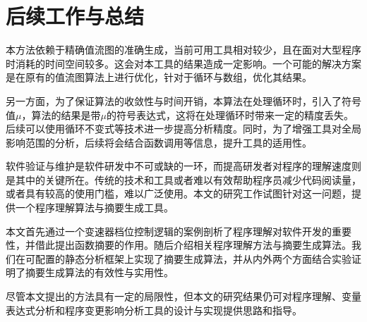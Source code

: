 \section{后续工作与总结}

本方法依赖于精确值流图的准确生成，当前可用工具相对较少，且在面对大型程序时消耗的时间空间较多。这会对本工具的结果造成一定影响。一个可能的解决方案是在原有的值流图算法上进行优化，针对于循环与数组，优化其结果。

另一方面，为了保证算法的收敛性与时间开销，本算法在处理循环时，引入了符号值$ \mu $，算法的结果是带$ \mu $的符号表达式，这将在处理循环时带来一定的精度丢失。后续可以使用循环不变式等技术进一步提高分析精度。同时，为了增强工具对全局影响范围的分析，后续将会结合函数调用等信息，提升工具的适用性。

软件验证与维护是软件研发中不可或缺的一环，而提高研发者对程序的理解速度则是其中的关键所在。传统的技术和工具或者难以有效帮助程序员减少代码阅读量，或者具有较高的使用门槛，难以广泛使用。本文的研究工作试图针对这一问题，提供一个程序理解算法与摘要生成工具。

本文首先通过一个变速器档位控制逻辑的案例剖析了程序理解对软件开发的重要性，并借此提出函数摘要的作用。随后介绍相关程序理解方法与摘要生成算法。我们在可配置的静态分析框架上实现了摘要生成算法，并从内外两个方面结合实验证明了摘要生成算法的有效性与实用性。

尽管本文提出的方法具有一定的局限性，但本文的研究结果仍可对程序理解、变量表达式分析和程序变更影响分析工具的设计与实现提供思路和指导。